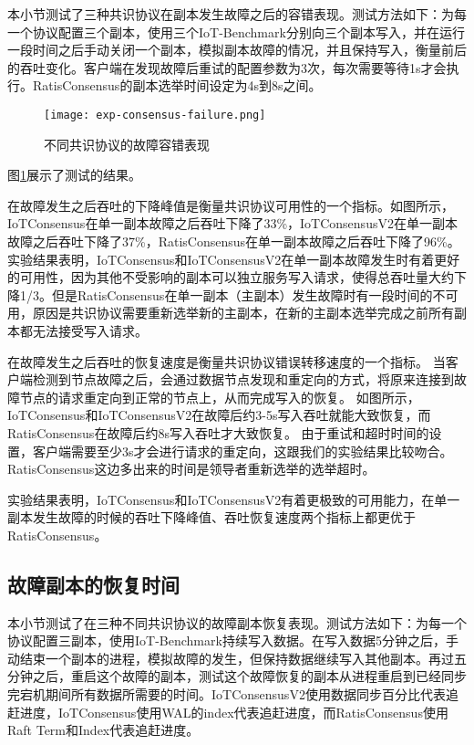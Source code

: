 本小节测试了三种共识协议在副本发生故障之后的容错表现。测试方法如下：为每一个协议配置三个副本，使用三个IoT-Benchmark分别向三个副本写入，并在运行一段时间之后手动关闭一个副本，模拟副本故障的情况，并且保持写入，衡量前后的吞吐变化。客户端在发现故障后重试的配置参数为3次，每次需要等待1s才会执行。RatisConsensus的副本选举时间设定为4s到8s之间。

\begin{figure}
    \centering
    \texttt{[image: exp-consensus-failure.png]}
    \caption{不同共识协议的故障容错表现}
    \label{fig:exp-consensus-failure}
\end{figure}


图\ref{fig:exp-consensus-failure}展示了测试的结果。

在故障发生之后吞吐的下降峰值是衡量共识协议可用性的一个指标。如图所示，IoTConsensus在单一副本故障之后吞吐下降了33\%，IoTConsensusV2在单一副本故障之后吞吐下降了37\%，RatisConsensus在单一副本故障之后吞吐下降了96\%。
实验结果表明，IoTConsensus和IoTConsensusV2在单一副本故障发生时有着更好的可用性，因为其他不受影响的副本可以独立服务写入请求，使得总吞吐量大约下降1/3。但是RatisConsensus在单一副本（主副本）发生故障时有一段时间的不可用，原因是共识协议需要重新选举新的主副本，在新的主副本选举完成之前所有副本都无法接受写入请求。

在故障发生之后吞吐的恢复速度是衡量共识协议错误转移速度的一个指标。
当客户端检测到节点故障之后，会通过数据节点发现和重定向的方式，将原来连接到故障节点的请求重定向到正常的节点上，从而完成写入的恢复。
如图所示，IoTConsensus和IoTConsensusV2在故障后约3-5s写入吞吐就能大致恢复，而RatisConsensus在故障后约8s写入吞吐才大致恢复。
由于重试和超时时间的设置，客户端需要至少3s才会进行请求的重定向，这跟我们的实验结果比较吻合。RatisConsensus这边多出来的时间是领导者重新选举的选举超时。

实验结果表明，IoTConsensus和IoTConsensusV2有着更极致的可用能力，在单一副本发生故障的时候的吞吐下降峰值、吞吐恢复速度两个指标上都更优于RatisConsensus。


\subsection{故障副本的恢复时间}

本小节测试了在三种不同共识协议的故障副本恢复表现。测试方法如下：为每一个协议配置三副本，使用IoT-Benchmark持续写入数据。在写入数据5分钟之后，手动结束一个副本的进程，模拟故障的发生，但保持数据继续写入其他副本。再过五分钟之后，重启这个故障的副本，测试这个故障恢复的副本从进程重启到已经同步完宕机期间所有数据所需要的时间。IoTConsensusV2使用数据同步百分比代表追赶进度，IoTConsensus使用WAL的index代表追赶进度，而RatisConsensus使用Raft Term和Index代表追赶进度。

